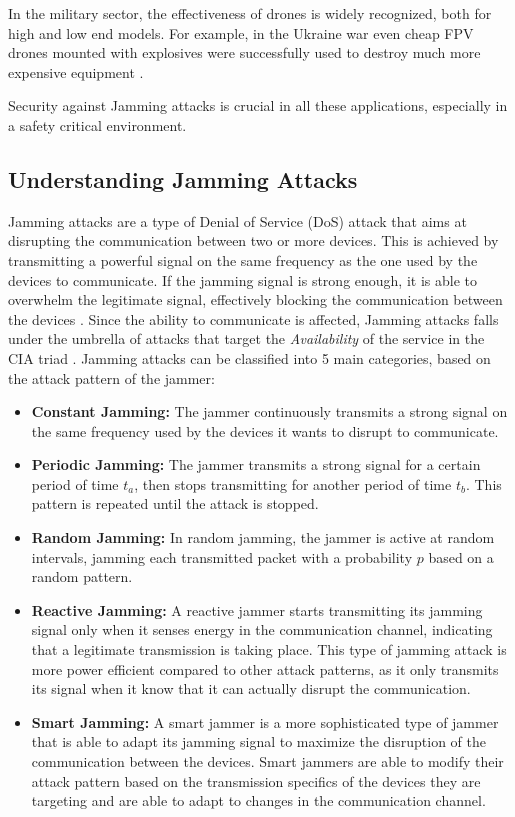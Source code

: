 \documentclass[futureinternet,article,submit,pdftex,moreauthors]{Definitions/mdpi}
\begin{document}
In the military sector, the effectiveness of drones is widely recognized, both for high and low end models. For example, in the Ukraine war even cheap FPV drones 
mounted with explosives were successfully used to destroy much more expensive equipment \cite{DroneCombatUkraine}. 

Security against Jamming attacks is crucial in all these applications, especially in a safety critical environment. 

\subsection{Understanding Jamming Attacks}

Jamming attacks are a type of Denial of Service (DoS) attack that aims at disrupting the communication between two or more devices. 
This is achieved by transmitting a powerful signal on the same frequency as the one used by the devices to communicate. If the jamming signal is strong enough, 
it is able to overwhelm the legitimate signal, effectively blocking the communication between the devices \cite{DroneCommHassija}. 
Since the ability to communicate is affected, Jamming attacks falls under the umbrella of attacks that target the \textit{Availability} of the service in the CIA triad \cite{DataIntegrityCawthra}. 
Jamming attacks can be classified into 5 main categories, based on the attack pattern of the jammer: 

\begin{itemize}
    \item \textbf{Constant Jamming:} The jammer continuously transmits a strong signal on the same frequency used by the devices it wants to disrupt to communicate. 
    \item \textbf{Periodic Jamming:} The jammer transmits a strong signal for a certain period of time \(t_a\), then stops transmitting for another period of time \(t_b\). This pattern is repeated until the attack is stopped.
    \item \textbf{Random Jamming:} In random jamming, the jammer is active at random intervals, jamming each transmitted packet with a probability 
    \(p\) based on a random pattern\cite{VANETsAI-Lyamin}. 
    \item \textbf{Reactive Jamming:} A reactive jammer starts transmitting its jamming signal only when it senses energy in the communication channel, 
    indicating that a legitimate transmission is taking place. This type of jamming attack is more power efficient compared to other 
    attack patterns, as it only transmits its signal when it know that it can actually disrupt the communication\cite{MLMisbehavior5GBoualouache}.
    \item \textbf{Smart Jamming:} A smart jammer is a more sophisticated type of jammer that is able to adapt its jamming signal to 
    maximize the disruption of the communication between the devices. Smart jammers are able to modify their attack pattern based on the 
    transmission specifics of the devices they are targeting and are able to adapt to changes in the communication channel\cite{AntiJammingV2V-Feng}.
\end{itemize}
\end{document}
